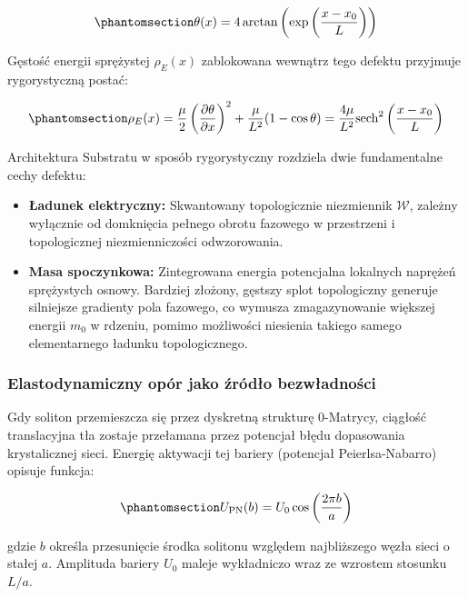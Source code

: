 \documentclass[
  polish,
  letterpaper,
  DIV=11,
  numbers=noendperiod,
  oneside]{scrartcl}
\providecommand{\tightlist}{%
  \setlength{\itemsep}{0pt}\setlength{\parskip}{0pt}}
\begin{document}
\begin{equation}\protect\phantomsection\label{eq-1-6-wz6-kinku}{\theta(x) = 4 \arctan\left( \exp\left( \frac{x - x_0}{L} \right) \right)}\end{equation}

Gęstość energii sprężystej \(\rho_{E}(x)\) zablokowana wewnątrz tego
defektu przyjmuje rygorystyczną postać:

\begin{equation}\protect\phantomsection\label{eq-1-6-wz7-esprez}{\rho_{E}(x) = \frac{\mu}{2} \left( \frac{\partial \theta}{\partial x} \right)^2 + \frac{\mu}{L^2} (1 - \cos\theta) = \frac{4\mu}{L^2} \text{sech}^2\left(\frac{x - x_0}{L}\right)}\end{equation}

Architektura Substratu w sposób rygorystyczny rozdziela dwie
fundamentalne cechy defektu:

\begin{itemize}
\tightlist
\item
  \textbf{Ładunek elektryczny:} Skwantowany topologicznie niezmiennik
  \(\mathcal{W}\), zależny wyłącznie od domknięcia pełnego obrotu
  fazowego w przestrzeni i topologicznej niezmienniczości odwzorowania.
\item
  \textbf{Masa spoczynkowa:} Zintegrowana energia potencjalna lokalnych
  naprężeń sprężystych osnowy. Bardziej złożony, gęstszy splot
  topologiczny generuje silniejsze gradienty pola fazowego, co wymusza
  zmagazynowanie większej energii \(m_0\) w rdzeniu, pomimo możliwości
  niesienia takiego samego elementarnego ładunku topologicznego.
\end{itemize}

\subsubsection{Elastodynamiczny opór jako źródło
bezwładności}\label{sec-1-6-2}

Gdy soliton przemieszcza się przez dyskretną strukturę 0-Matrycy,
ciągłość translacyjna tła zostaje przełamana przez potencjał błędu
dopasowania krystalicznej sieci. Energię aktywacji tej bariery
(potencjał Peierlsa-Nabarro) opisuje funkcja:

\begin{equation}\protect\phantomsection\label{eq-1-6-wz8-enaktyw}{U_{\text{PN}}(b) = U_0 \cos\left( \frac{2\pi b}{a} \right)}\end{equation}

gdzie \(b\) określa przesunięcie środka solitonu względem najbliższego
węzła sieci o stałej \(a\). Amplituda bariery \(U_0\) maleje wykładniczo
wraz ze wzrostem stosunku \(L/a\).
\end{document}
